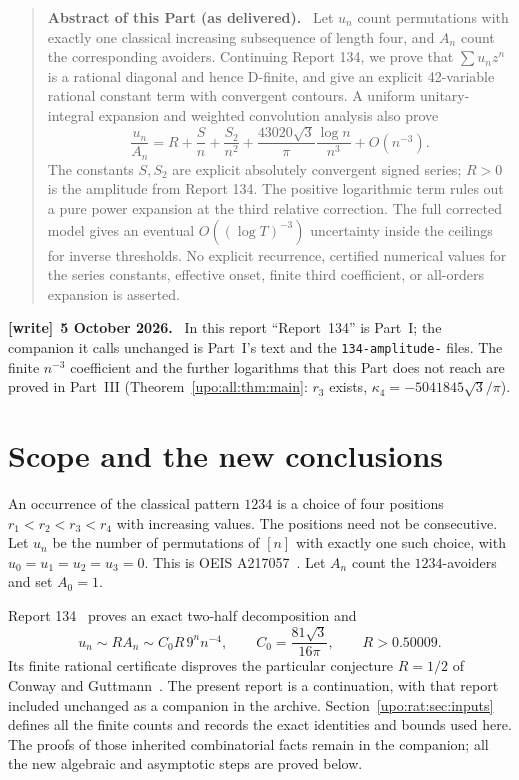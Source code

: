 \documentclass[11pt,letterpaper]{article}
\theoremstyle{remark}\newtheorem{remark}[theorem]{Remark}
\numberwithin{equation}{section}
\newcommand{\file}[1]{\nolinkurl{#1}}
\newenvironment{writenote}[1][]{\par\smallskip\begingroup\small
 \noindent\textbf{[write]}\if\relax\detokenize{#1}\relax\else~\textbf{#1.}\fi\ }%
 {\par\endgroup\smallskip}
\newenvironment{partabstract}{\begin{quote}\small\noindent\textbf{Abstract of this Part (as delivered).}\ }{\end{quote}}
\begin{document}
\begin{partabstract}
Let $u_n$ count permutations with exactly one classical increasing
subsequence of length four, and $A_n$ count the corresponding avoiders.
Continuing Report 134, we prove that $\sum u_nz^n$ is a rational diagonal
and hence D-finite, and give an explicit 42-variable rational constant
term with convergent contours. A uniform unitary-integral expansion and
weighted convolution analysis also prove
\[
\frac{u_n}{A_n}=R+\frac Sn+\frac{S_2}{n^2}
+\frac{43020\sqrt3}{\pi}\frac{\log n}{n^3}+O(n^{-3}).
\]
The constants $S,S_2$ are explicit absolutely convergent signed series;
$R>0$ is the amplitude from Report 134. The positive logarithmic term
rules out a pure power expansion at the third relative correction.
The full corrected model gives an eventual $O((\log T)^{-3})$ uncertainty
inside the ceilings for inverse thresholds. No explicit recurrence,
certified numerical values for the series constants, effective onset,
finite third coefficient, or all-orders expansion is asserted.
\end{partabstract}
\begin{writenote}[5 October 2026]
In this report ``Report~134'' \cite{R134} is Part~I; the companion it calls unchanged is Part~I's text and the \file{134-amplitude-} files. The finite $n^{-3}$ coefficient and the further logarithms that this Part does not reach are proved in Part~III (Theorem~\ref{upo:all:thm:main}: $r_3$ exists, $\kappa_4=-5041845\sqrt3/\pi$).
\end{writenote}


\section{Scope and the new conclusions}
An occurrence of the classical pattern $1234$ is a choice of four
positions $r_1<r_2<r_3<r_4$ with increasing values. The positions need not
be consecutive. Let $u_n$ be the number of permutations of $[n]$ with
exactly one such choice, with $u_0=u_1=u_2=u_3=0$. This is
OEIS A217057~\cite{OEIS217057}. Let $A_n$ count the $1234$-avoiders and set
$A_0=1$.

Report 134~\cite{R134} proves an exact two-half decomposition and
\begin{equation}\label{upo:rat:eq:oldlimit}
u_n\sim R A_n\sim C_0R\,9^n n^{-4},
\qquad C_0=\frac{81\sqrt3}{16\pi},\qquad R>0.50009.
\end{equation}
Its finite rational certificate disproves the particular conjecture
$R=1/2$ of Conway and Guttmann~\cite[Section 5.1]{CG}.
The present report is a continuation, with that report included unchanged
as a companion in the archive. Section~\ref{upo:rat:sec:inputs} defines all the
finite counts and records the exact identities and bounds used here.
The proofs of those inherited combinatorial facts remain in the companion;
all the new algebraic and asymptotic steps are proved below.
\end{document}
